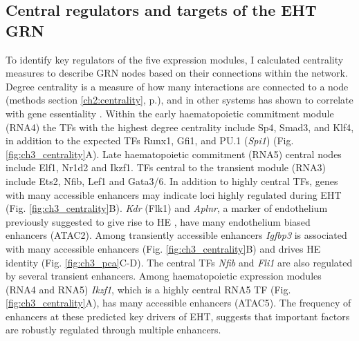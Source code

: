 \subsection{\label{ch3:centrality}Central regulators and targets of the EHT GRN}

To identify key regulators of the five expression modules, I calculated centrality measures to describe GRN nodes based on their connections within the network. Degree centrality is a measure of how many interactions are connected to a node (methods section \ref{ch2:centrality}, p.\pageref{ch2:centrality}), and in other systems has shown to correlate with gene essentiality \citep{hahn_comparative_2005, jeong_lethality_2001, koschutzki_centrality_2008}. Within the early haematopoietic commitment module (RNA4) the TFs with the highest degree centrality include Sp4, Smad3, and Klf4, in addition to the expected TFs Runx1, Gfi1, and PU.1 (\textit{Spi1}) (Fig. \ref{fig:ch3_centrality}A). Late haematopoietic commitment (RNA5) central nodes include Elf1, Nr1d2 and Ikzf1. TFs central to the transient module (RNA3) include Ets2, Nfib, Lef1 and Gata3/6. In addition to highly central TFs, genes with many accessible enhancers may indicate loci highly regulated during EHT (Fig. \ref{fig:ch3_centrality}B). \textit{Kdr} (Flk1) and \textit{Aplnr}, a marker of endothelium previously suggested to give rise to HE \citep{crosse_multi-layered_2020}, have many endothelium biased enhancers (ATAC2). Among transiently accessible enhancers \textit{Igfbp3} is associated with many accessible enhancers (Fig. \ref{fig:ch3_centrality}B) and drives HE identity (Fig. \ref{fig:ch3_pca}C-D). The central TFs \textit{Nfib} and \textit{Fli1} are also regulated by several transient enhancers. Among haematopoietic expression modules (RNA4 and RNA5) \textit{Ikzf1}, which is a highly central RNA5 TF (Fig. \ref{fig:ch3_centrality}A), has many accessible enhancers (ATAC5). The frequency of enhancers at these predicted key drivers of EHT, suggests that important factors are robustly regulated through multiple enhancers.

